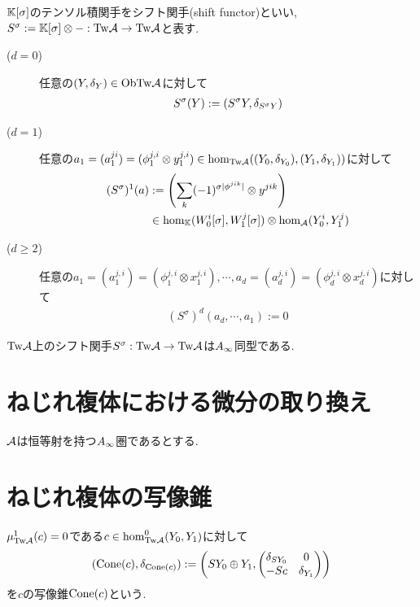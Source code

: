 \documentclass[uplatex, a4paper, 14Q, dvipdfmx]{jsarticle}
\begin{document}
\begin{definition}[$\Tw\A$上のシフト関手]
  $\mathbb{K}[\sigma]$のテンソル積関手をシフト関手(shift functor)といい, $S^\sigma := \mathbb{K}[\sigma] \otimes - : \mathrm{Tw}\mathcal{A} \to \mathrm{Tw}\mathcal{A}$と表す. 
  \begin{description}
    \item[($d=0$)] 任意の$(Y,\delta_Y) \in \mathrm{Ob}\mathrm{Tw}\mathcal{A}$に対して
    \begin{align*}
      S^\sigma(Y) := (S^\sigma Y, \delta_{S^\sigma Y})
    \end{align*}
    \item[($d=1$)] 任意の$a_1 = (a_1^{ji}) = (\phi_1^{j,i} \otimes y_1^{j,i}) \in \hom_{\mathrm{Tw}\mathcal{A}}((Y_0,\delta_{Y_0}),(Y_1,\delta_{Y_1}))$に対して
    \begin{align*}
      (S^\sigma)^1(a) 
      &:= \qty(\sum_{k} (-1)^{\sigma |\phi^{jik}|} \otimes y^{jik}) \\
      &\in \hom_{\mathbb{K}}(W_0^i[\sigma], W_1^j[\sigma]) \otimes \hom_{\mathcal{A}}(Y_0^i,Y_1^j)
    \end{align*}
    \item[($d \geq 2$)] 任意の$a_1 = (a_1^{j,i}) = (\phi_1^{j,i} \otimes x_1^{j,i}), \cdots, a_d = (a_d^{j,i}) = (\phi_d^{j,i} \otimes x_d^{j,i})$に対して
    \begin{align*}
      (S^\sigma)^d(a_d,\cdots,a_1)
      := 0
    \end{align*}
  \end{description}
\end{definition}

\begin{lemma} \label{prop_shift_functor_is_Ainf_iso}
  $\Tw\A$上のシフト関手$S^\sigma : \mathrm{Tw}\mathcal{A} \to \mathrm{Tw}\mathcal{A}$は$A_{\infty}$同型である. 
\end{lemma}

\section{ねじれ複体における微分の取り換え}

$\mathcal{A}$は恒等射を持つ$A_{\infty}$圏であるとする.

\begin{definition}
  
\end{definition}

\section{ねじれ複体の写像錐}

\begin{definition}[ねじれ複体の写像錐]
  $\mu^1_{\mathrm{Tw}\mathcal{A}}(c)=0$である$c \in \hom^0_{\mathrm{Tw}\mathcal{A}}(Y_0,Y_1)$に対して
  \begin{align*}
    (\mathrm{Cone}(c), \delta_{\mathrm{Cone}(c)}) 
    := \qty(SY_0 \oplus Y_1, \begin{pmatrix}
      \delta_{SY_0} & 0 \\
      -Sc & \delta_{Y_1} 
    \end{pmatrix})
  \end{align*}
  を$c$の写像錐$\mathrm{Cone}(c)$という.
\end{definition}
\end{document}
